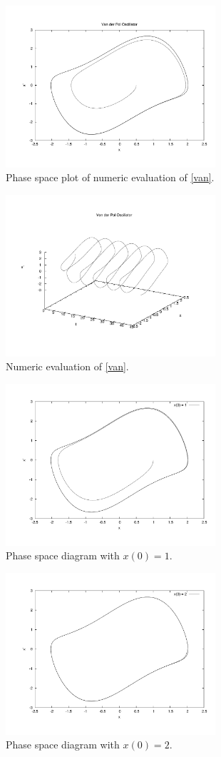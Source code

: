 \documentclass[12pt]{article}
\begin{document}
\begin{figure}[!h]
\centering
\includegraphics[width =110 mm, height = 60mm]{Fig_5_10_c.pdf}
\caption{Phase space plot of numeric evaluation of \eqref{van}.}
\label{fig:5_10c}
\end{figure}
\begin{figure}[!h]
\centering
\includegraphics[width =110 mm, height = 60mm]{Fig_5_10_d.pdf}
\caption{Numeric evaluation of \eqref{van}.}
\label{fig:5_10d}
\end{figure}
\begin{figure}[!h]
\centering
\includegraphics[width =110 mm, height = 60mm]{Ex_5_19_1.pdf}
\caption{Phase space diagram with $x(0)=1$.}
\label{fig:5_19a}
\end{figure}
\begin{figure}[!h]
\centering
\includegraphics[width =110 mm, height = 60mm]{Ex_5_19_2.pdf}
\caption{Phase space diagram with $x(0)=2$.}
\label{fig:5_19b}
\end{figure}
\end{document}
